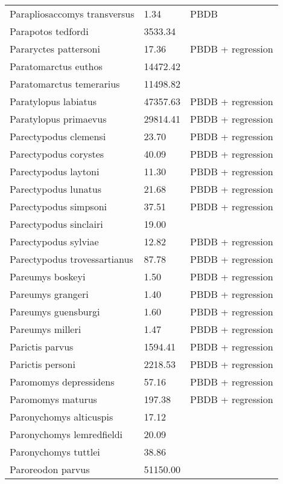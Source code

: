 \documentclass{article}
\begin{document}
\begin{center}
\begin{longtable}{p{} p{} p{}}
    Parapliosaccomys transversus & 1.34 & PBDB \\ 
    Parapotos tedfordi & 3533.34 & \cite{Tomiya2013} \\ 
    Pararyctes pattersoni & 17.36 & PBDB + regression \\ 
    Paratomarctus euthos & 14472.42 & \cite{Tomiya2013} \\ 
    Paratomarctus temerarius & 11498.82 & \cite{Tomiya2013} \\ 
    Paratylopus labiatus & 47357.63 & PBDB + regression \\ 
    Paratylopus primaevus & 29814.41 & PBDB + regression \\ 
    Parectypodus clemensi & 23.70 & PBDB + regression \\ 
    Parectypodus corystes & 40.09 & PBDB + regression \\ 
    Parectypodus laytoni & 11.30 & PBDB + regression \\ 
    Parectypodus lunatus & 21.68 & PBDB + regression \\ 
    Parectypodus simpsoni & 37.51 & PBDB + regression \\ 
    Parectypodus sinclairi & 19.00 & \cite{Wilson2012} \\ 
    Parectypodus sylviae & 12.82 & PBDB + regression \\ 
    Parectypodus trovessartianus & 87.78 & PBDB + regression \\ 
    Pareumys boskeyi & 1.50 & PBDB + regression \\ 
    Pareumys grangeri & 1.40 & PBDB + regression \\ 
    Pareumys guensburgi & 1.60 & PBDB + regression \\ 
    Pareumys milleri & 1.47 & PBDB + regression \\ 
    Parictis parvus & 1594.41 & PBDB + regression \\ 
    Parictis personi & 2218.53 & PBDB + regression \\ 
    Paromomys depressidens & 57.16 & PBDB + regression \\ 
    Paromomys maturus & 197.38 & PBDB + regression \\ 
    Paronychomys alticuspis & 17.12 & \cite{Tomiya2013} \\ 
    Paronychomys lemredfieldi & 20.09 & \cite{Tomiya2013} \\ 
    Paronychomys tuttlei & 38.86 & \cite{Tomiya2013} \\ 
    Paroreodon parvus & 51150.00 & \cite{McKenna2011} \\ 

\end{longtable}
\end{center}
\end{document}
